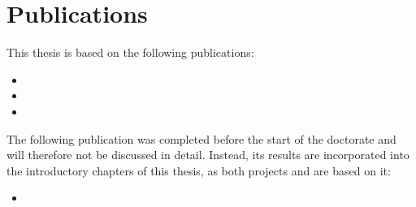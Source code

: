 \chapter*{Publications}

This thesis is based on the following publications:
\begin{itemize}[leftmargin=17pt]
	\item[\cite{Bringmann:2023opz}] 
	\item[\cite{Bringmann:2023iuz}] 
	\item[\cite{Depta:2023qst}] 
\end{itemize}\vspace{15pt}

The following publication was completed before the start of the doctorate and will therefore not be discussed in detail. Instead, its results are incorporated into the introductory chapters of this thesis, as both projects \cite{Bringmann:2023opz} and \cite{Bringmann:2023iuz} are based on it:
\begin{itemize}[leftmargin=17pt]
	\item[\cite{Ertas:2021xeh}] 
\end{itemize}

